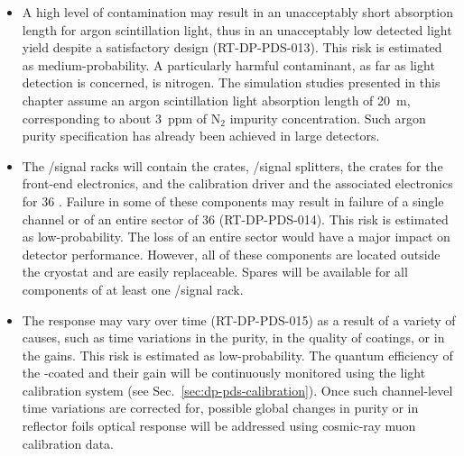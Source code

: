 \begin{itemize}

\item A high level of  contamination may result in an unacceptably short absorption length for argon scintillation light, thus in an unacceptably low detected light yield despite a satisfactory  design (RT-DP-PDS-013). This risk is estimated as medium-probability. A particularly harmful contaminant, as far as light detection is concerned, is nitrogen. The simulation studies presented in this chapter assume an argon scintillation light absorption length of \SI{20}{m}, corresponding to about \SI{3}{ppm} of N$_2$ impurity concentration. Such argon purity specification has already been achieved in large  detectors.

\item The /signal racks will contain the  crates, /signal splitters, the  crates for the front-end electronics, and the calibration  driver and the associated electronics for \num{36} . Failure in some of these components may result in failure of a single  channel or of an entire sector of \num{36}  (RT-DP-PDS-014). This risk is estimated as low-probability. The loss of an entire  sector would have a major impact on detector performance. However, all of these components are located outside the cryostat and are easily replaceable. Spares will be available for all components of at least one /signal rack.

\item The  response may vary over time (RT-DP-PDS-015) as a result of a variety of causes, such as time variations in the  purity, in the quality of  coatings, or in the  gains. This risk is estimated as low-probability. The quantum efficiency of the -coated  and their gain will be continuously monitored using the light calibration system (see Sec.~\ref{sec:dp-pds-calibration}). Once such channel-level time variations are corrected for, possible global changes in  purity or in  reflector foils optical response will be addressed using cosmic-ray muon calibration data. 

\end{itemize}
